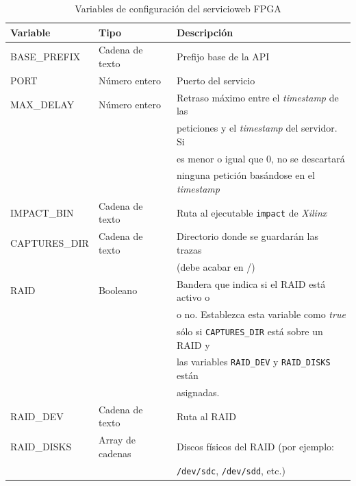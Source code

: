 \begin{table}
\centering
\begin{tabular}{|l|l|l|}
\hline
\rowcolor[HTML]{F5F5F5}
\textbf{Variable}   & \textbf{Tipo}    & \textbf{Descripción}                                           \\ \hline
BASE\_PREFIX        & Cadena de texto  & Prefijo base de la \gls{API}                                   \\ \hline
PORT                & Número entero    & Puerto del servicio                                            \\ \hline
MAX\_DELAY          & Número entero    & Retraso máximo entre el \textit{timestamp} de las              \\
                    &                  & peticiones y el \textit{timestamp} del servidor. Si            \\
                    &                  & es menor o igual que 0, no se descartará                       \\
                    &                  & ninguna petición basándose en el \textit{timestamp}            \\ \hline
IMPACT\_BIN         & Cadena de texto  & Ruta al ejecutable \texttt{impact} de \textit{Xilinx}          \\ \hline
CAPTURES\_DIR       & Cadena de texto  & Directorio donde se guardarán las \glspl{traza}                \\
                    &                  & (debe acabar en /)                                             \\ \hline
RAID                & Booleano         & Bandera que indica si el \gls{RAID} está activo o              \\
                    &                  & o no. Establezca esta variable como \textit{true}              \\
                    &                  & sólo si \texttt{CAPTURES\_DIR} está sobre un \gls{RAID} y      \\
                    &                  & las variables \texttt{RAID\_DEV} y \texttt{RAID\_DISKS} están  \\
                    &                  & asignadas.                                                     \\ \hline
RAID\_DEV           & Cadena de texto  & Ruta al \gls{RAID}                                             \\ \hline
RAID\_DISKS         & Array de cadenas & Discos físicos del \gls{RAID} (por ejemplo:                    \\
                    &                  & \texttt{/dev/sdc}, \texttt{/dev/sdd}, etc.)                    \\ \hline
\end{tabular}
\caption{Variables de configuración del \gls{servicioweb} \gls{FPGA}}
\label{extra:manual:paramsfpga}
\end{table}


